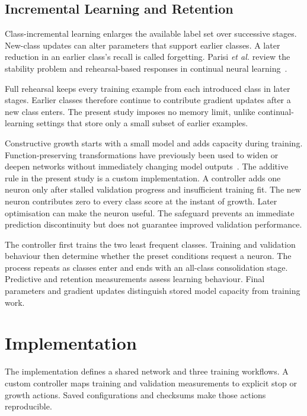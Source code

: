 \documentclass[conference,10pt]{IEEEtran}
\begin{document}
\subsection{Incremental Learning and Retention}

Class-incremental learning enlarges the available label set over successive stages. New-class updates can alter parameters that support earlier classes. A later reduction in an earlier class's recall is called forgetting. Parisi \textit{et al.} review the stability problem and rehearsal-based responses in continual neural learning~\cite{parisi2019}.

Full rehearsal keeps every training example from each introduced class in later stages. Earlier classes therefore continue to contribute gradient updates after a new class enters. The present study imposes no memory limit, unlike continual-learning settings that store only a small subset of earlier examples.

Constructive growth starts with a small model and adds capacity during training. Function-preserving transformations have previously been used to widen or deepen networks without immediately changing model outputs~\cite{chen2016}. The additive rule in the present study is a custom implementation. A controller adds one neuron only after stalled validation progress and insufficient training fit. The new neuron contributes zero to every class score at the instant of growth. Later optimisation can make the neuron useful. The safeguard prevents an immediate prediction discontinuity but does not guarantee improved validation performance.

The controller first trains the two least frequent classes. Training and validation behaviour then determine whether the preset conditions request a neuron. The process repeats as classes enter and ends with an all-class consolidation stage. Predictive and retention measurements assess learning behaviour. Final parameters and gradient updates distinguish stored model capacity from training work.

\section{Implementation}

The implementation defines a shared network and three training workflows. A custom controller maps training and validation measurements to explicit stop or growth actions. Saved configurations and checksums make those actions reproducible.
\end{document}
